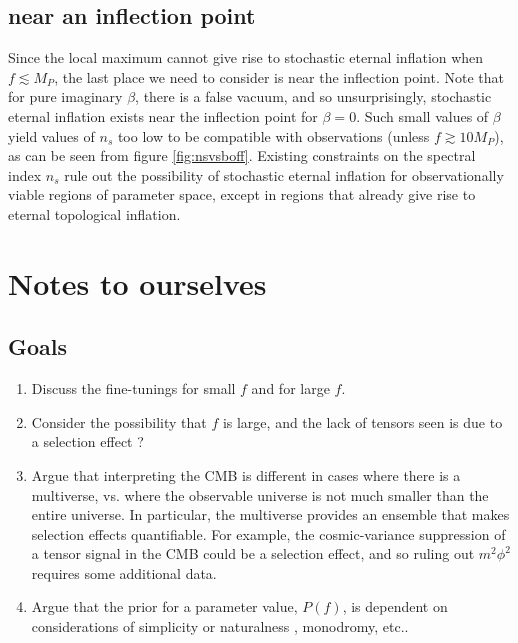 \documentclass[aps,amsfonts,amsmath,prd,preprint,nofootinbib,superscriptaddress]{revtex4}
\newcommand{\Mp}{{M_{P}}}
\begin{document}
\begin{appendix}
\subsection{near an inflection point}
Since the local maximum cannot give rise to stochastic eternal inflation when $f \lesssim \Mp$, the last place we need to consider is near the inflection point. 
Note that for pure imaginary $\beta$, there is a false vacuum, and so unsurprisingly, stochastic eternal inflation exists near the inflection point for $\beta = 0$.  Such small
values of $\beta$ yield values of $n_s$ too low to be compatible with observations (unless $f \gtrsim 10 \Mp$), as can be seen from figure \ref{fig:nsvsboff}. 
Existing constraints on the spectral index $n_s$ rule out the possibility of stochastic eternal inflation for observationally viable regions of
parameter space, except in regions that already give rise to eternal topological inflation.



\section{Notes to ourselves}
\subsection{Goals}
\begin{enumerate}
\item Discuss the fine-tunings for small $f$ and for large $f$.  

\item Consider the possibility that $f$ is large, and the lack of tensors seen is due to a selection effect ?

\item Argue that interpreting the CMB is different in cases where there is a multiverse, vs. where the observable universe is not much smaller than the entire universe.  In particular, the multiverse provides an ensemble
that makes selection effects quantifiable.  For example, the cosmic-variance suppression of a tensor signal in the CMB could be a selection effect, and so ruling out $m^2\phi^2$ requires some additional data.  



\item Argue that the prior for a parameter value, $P(f)$, is dependent on considerations of simplicity or naturalness \cite{Musoke:2017frr}, monodromy, etc..


\end{enumerate}
\end{appendix}
\end{document}

